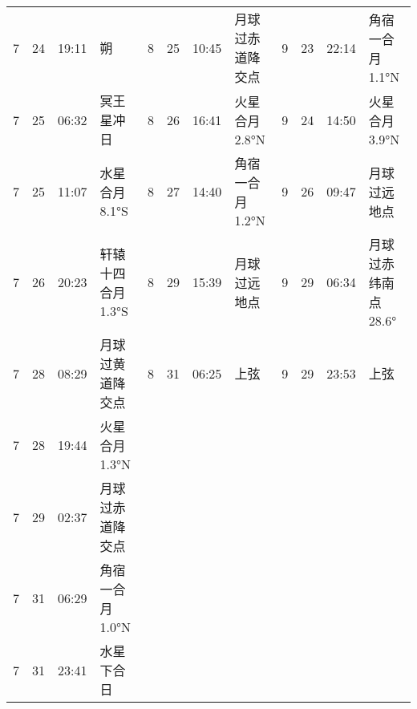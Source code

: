 \begin{tabular}{llll|llll|llll}
7 & 24 & 19:11 & 朔 & 8 & 25 & 10:45 & 月球过赤道降交点 & 9 & 23 & 22:14 & 角宿一合月 1.1°N \tabularnewline
7 & 25 & 06:32 & 冥王星冲日 & 8 & 26 & 16:41 & 火星合月 2.8°N & 9 & 24 & 14:50 & 火星合月 3.9°N \tabularnewline
7 & 25 & 11:07 & 水星合月 8.1°S & 8 & 27 & 14:40 & 角宿一合月 1.2°N & 9 & 26 & 09:47 & 月球过远地点 \tabularnewline
7 & 26 & 20:23 & 轩辕十四合月 1.3°S & 8 & 29 & 15:39 & 月球过远地点 & 9 & 29 & 06:34 & 月球过赤纬南点 28.6° \tabularnewline
7 & 28 & 08:29 & 月球过黄道降交点 & 8 & 31 & 06:25 & 上弦 & 9 & 29 & 23:53 & 上弦 \tabularnewline
7 & 28 & 19:44 & 火星合月 1.3°N &  &  &  &  &  &  &  &  \tabularnewline
7 & 29 & 02:37 & 月球过赤道降交点 &  &  &  &  &  &  &  &  \tabularnewline
7 & 31 & 06:29 & 角宿一合月 1.0°N &  &  &  &  &  &  &  &  \tabularnewline
7 & 31 & 23:41 & 水星下合日 &  &  &  &  &  &  &  &  \tabularnewline
\hline \end{tabular}

